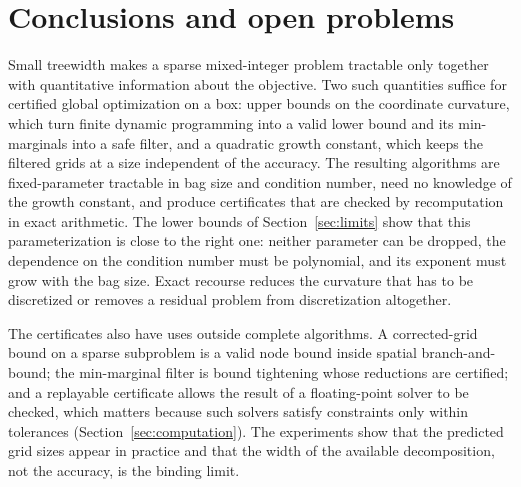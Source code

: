 \section{Conclusions and open problems}\label{sec:conclusion}

Small treewidth makes a sparse mixed-integer problem tractable only together
with quantitative information about the objective. Two such quantities
suffice for certified global optimization on a box: upper bounds on the
coordinate curvature, which turn finite dynamic programming into a valid lower
bound and its min-marginals into a safe filter, and a quadratic growth
constant, which keeps the filtered grids at a size independent of the
accuracy. The resulting algorithms are fixed-parameter tractable in bag size
and condition number, need no knowledge of the growth constant, and produce
certificates that are checked by recomputation in exact arithmetic. The lower
bounds of Section~\ref{sec:limits} show that this parameterization is close to
the right one: neither parameter can be dropped, the dependence on the
condition number must be polynomial, and its exponent must grow with the bag
size. Exact recourse reduces the curvature that has to be discretized or
removes a residual problem from discretization altogether.

The certificates also have uses outside complete algorithms. A corrected-grid
bound on a sparse subproblem is a valid node bound inside spatial
branch-and-bound; the min-marginal filter is bound tightening whose
reductions are certified; and a replayable certificate allows the result of a
floating-point solver to be checked, which matters because such solvers satisfy
constraints only within tolerances (Section~\ref{sec:computation}). The
experiments show that the predicted grid sizes appear in practice and that the
width of the available decomposition, not the accuracy, is the binding limit.


